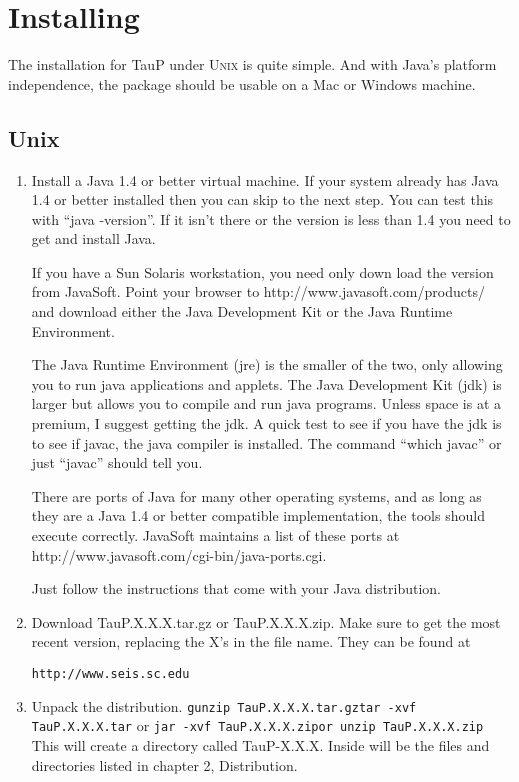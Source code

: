 
\section{Installing}
\label{install}

The installation for TauP under \textsc{Unix} is quite simple. And with Java's 
platform independence, the package should be usable on a Mac or Windows
machine.

\subsection{Unix}

\begin{enumerate}
\item Install a Java 1.4 or better virtual machine. If your system already has Java 1.4
or better installed then you can skip to the next step. You can test this
with ``java -version''. If it isn't there or the version is less than 1.4
you need to get and install Java.

If you have a Sun Solaris
workstation, you need only down load the version from JavaSoft. Point
your browser to http://www.javasoft.com/products/ and download either
the Java Development Kit or the Java Runtime Environment.

The Java Runtime Environment (jre)
is the smaller of the two, only allowing you to run java applications and applets.
The Java Development Kit (jdk) is larger but allows you
to compile and run java programs. 
Unless space is at a
premium, I suggest getting the jdk. A quick test to see if you have
the jdk is to see if javac, the java compiler is installed. The command
``which javac'' or just ``javac'' should tell you. 

There are ports of Java for many other operating systems, and as long as
they are a Java 1.4 or better compatible implementation, the tools 
should execute correctly.
JavaSoft maintains a list of these ports at\newline
http://www.javasoft.com/cgi-bin/java-ports.cgi.

Just follow the instructions that come with your Java distribution.

\item Download TauP.X.X.X.tar.gz or TauP.X.X.X.zip. Make sure to get the most recent version, replacing the X's  in the file name. They can be found at

\texttt{http://www.seis.sc.edu}

\item Unpack the distribution.
\texttt{\newline gunzip TauP.X.X.X.tar.gz\newline tar -xvf TauP.X.X.X.tar\newline}
or
\texttt{\newline jar -xvf TauP.X.X.X.zip\newline or unzip TauP.X.X.X.zip}
This will create a directory called TauP-X.X.X. Inside
will be the files and directories listed in chapter 2, Distribution.


\end{enumerate}
